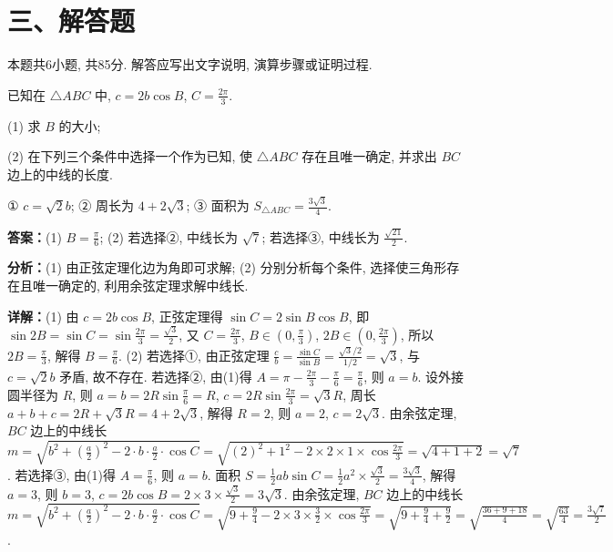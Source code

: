 \section*{三、解答题}
本题共6小题, 共85分. 解答应写出文字说明, 演算步骤或证明过程.

\begin{question}[points=13]
已知在 $\triangle ABC$ 中, $c=2b\cos B$, $C=\frac{2\pi}{3}$.

(1) 求 $B$ 的大小;

(2) 在下列三个条件中选择一个作为已知, 使 $\triangle ABC$ 存在且唯一确定, 并求出 $BC$ 边上的中线的长度.

① $c=\sqrt{2}b$; ② 周长为 $4+2\sqrt{3}$; ③ 面积为 $S_{\triangle ABC}=\frac{3\sqrt{3}}{4}$.
\begin{solution}
\textbf{答案：}(1) $B=\frac{\pi}{6}$; (2) 若选择②, 中线长为 $\sqrt{7}$; 若选择③, 中线长为 $\frac{\sqrt{21}}{2}$.

\textbf{分析：}(1) 由正弦定理化边为角即可求解; (2) 分别分析每个条件, 选择使三角形存在且唯一确定的, 利用余弦定理求解中线长.

\textbf{详解：}(1) 由 $c=2b\cos B$, 正弦定理得 $\sin C=2\sin B\cos B$, 即 $\sin 2B=\sin C=\sin\frac{2\pi}{3}=\frac{\sqrt{3}}{2}$, 又 $C=\frac{2\pi}{3}$, $B\in(0,\frac{\pi}{3})$, $2B\in(0,\frac{2\pi}{3})$, 所以 $2B=\frac{\pi}{3}$, 解得 $B=\frac{\pi}{6}$.
(2) 若选择①, 由正弦定理 $\frac{c}{b}=\frac{\sin C}{\sin B}=\frac{\sqrt{3}/2}{1/2}=\sqrt{3}$, 与 $c=\sqrt{2}b$ 矛盾, 故不存在.
若选择②, 由(1)得 $A=\pi-\frac{2\pi}{3}-\frac{\pi}{6}=\frac{\pi}{6}$, 则 $a=b$. 设外接圆半径为 $R$, 则 $a=b=2R\sin\frac{\pi}{6}=R$, $c=2R\sin\frac{2\pi}{3}=\sqrt{3}R$, 周长 $a+b+c=2R+\sqrt{3}R=4+2\sqrt{3}$, 解得 $R=2$, 则 $a=2$, $c=2\sqrt{3}$. 由余弦定理, $BC$ 边上的中线长 $m=\sqrt{b^2+(\frac{a}{2})^2-2\cdot b\cdot\frac{a}{2}\cdot\cos C}=\sqrt{(2)^2+1^2-2\times2\times1\times\cos\frac{2\pi}{3}}=\sqrt{4+1+2}=\sqrt{7}$.
若选择③, 由(1)得 $A=\frac{\pi}{6}$, 则 $a=b$. 面积 $S=\frac{1}{2}ab\sin C=\frac{1}{2}a^2\times\frac{\sqrt{3}}{2}=\frac{3\sqrt{3}}{4}$, 解得 $a=3$, 则 $b=3$, $c=2b\cos B=2\times3\times\frac{\sqrt{3}}{2}=3\sqrt{3}$. 由余弦定理, $BC$ 边上的中线长 $m=\sqrt{b^2+(\frac{a}{2})^2-2\cdot b\cdot\frac{a}{2}\cdot\cos C}=\sqrt{9+\frac{9}{4}-2\times3\times\frac{3}{2}\times\cos\frac{2\pi}{3}}=\sqrt{9+\frac{9}{4}+\frac{9}{2}}=\sqrt{\frac{36+9+18}{4}}=\sqrt{\frac{63}{4}}=\frac{3\sqrt{7}}{2}$.
\end{solution}
\end{question}

